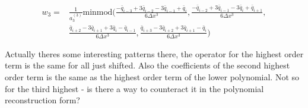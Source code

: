 \documentclass[10pt]{article}
\newcommand\minmod{\text{minmod}}
\begin{document}
\begin{align*}
w_3 =& \frac{1}{a^{(3)}_3} \minmod\Bigg(\frac{ -\bar{q}_{i-3} + 3\bar{q}_{i-2} -3\bar{q}_{i-1} + \bar{q}_{i} }{6 \Delta x^3}
,\frac{-\bar{q}_{i-2} + 3\bar{q}_{i-1} -3\bar{q}_{i} + \bar{q}_{i+1} }{6 \Delta x^3}, \\ &\frac{ \bar{q}_{i+2} -3\bar{q}_{i+1} +3 \bar{q}_{i} - \bar{q}_{i-1}}{6 \Delta x^3} ,\frac{ \bar{q}_{i+3} -3\bar{q}_{i+2} +3 \bar{q}_{i+1} - \bar{q}_{i}}{6 \Delta x^3}\Bigg)
\end{align*}

Actually theres some interesting patterns there, the operator for the highest order term is the same for all just shifted. Also the coefficients of the second highest order term is the same as the highest order term of the lower polynomial. Not so for the third highest - is there a way to counteract it in the polynomial reconstruction form?
\end{document}
